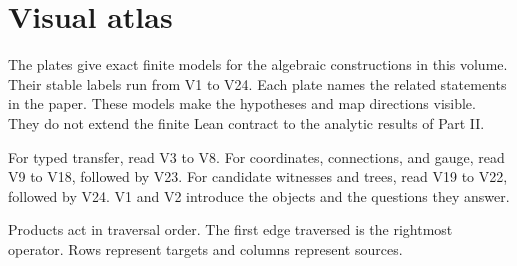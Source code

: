 \documentclass[11pt,letterpaper]{article}
\theoremstyle{plain}
\theoremstyle{definition}
\theoremstyle{remark}
\begin{document}
\section{Visual atlas}\label{app:visual-atlas}
The plates give exact finite models for the algebraic constructions in this volume. Their stable labels run from V1 to V24. Each plate names the related statements in the paper. These models make the hypotheses and map directions visible. They do not extend the finite Lean contract to the analytic results of Part II.
\begin{readerroadmap}[title={Three routes through the atlas}]
For typed transfer, read V3 to V8. For coordinates, connections, and gauge, read V9 to V18, followed by V23. For candidate witnesses and trees, read V19 to V22, followed by V24. V1 and V2 introduce the objects and the questions they answer.
\end{readerroadmap}
Products act in traversal order. The first edge traversed is the rightmost operator. Rows represent targets and columns represent sources.
\clearpage
\begingroup
{}\fontsize{10}{12}\selectfont
\setlength{\parskip}{3pt}\setlength{\abovedisplayskip}{6pt}\setlength{\belowdisplayskip}{6pt}

\endgroup
\clearpage
\begingroup\small{}


\endgroup
\end{document}

